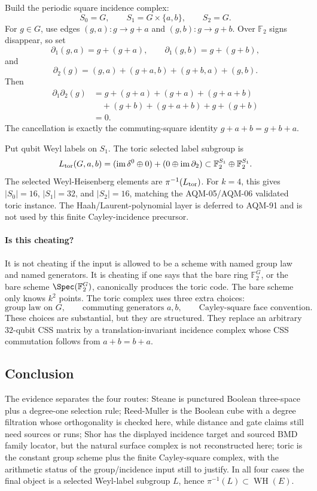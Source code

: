 Build the periodic square incidence complex:
\[
  S_0=G,\qquad S_1=G\times\{a,b\},\qquad S_2=G .
\]
For \(g\in G\), use edges \((g,a):g\to g+a\) and \((g,b):g\to g+b\).  Over
\(\mathbb F_2\) signs disappear, so set
\[
  \partial_1(g,a)=g+(g+a),\qquad
  \partial_1(g,b)=g+(g+b),
\]
and
\[
  \partial_2(g)=(g,a)+(g+a,b)+(g+b,a)+(g,b).
\]
Then
\[
\begin{aligned}
\partial_1\partial_2(g)
&=g+(g+a)+(g+a)+(g+a+b)\\
&\quad +(g+b)+(g+a+b)+g+(g+b)\\
&=0 .
\end{aligned}
\]
The cancellation is exactly the commuting-square identity \(g+a+b=g+b+a\).

Put qubit Weyl labels on \(S_1\).  The toric selected label subgroup is
\[
  L_{\rm tor}(G,a,b)
  =
  (\operatorname{im}\delta^0\oplus0)+(0\oplus\operatorname{im}\partial_2)
  \subset \mathbb F_2^{S_1}\oplus\mathbb F_2^{S_1}.
\]
The selected Weyl-Heisenberg elements are \(\pi^{-1}(L_{\rm tor})\).  For
\(k=4\), this gives \(|S_0|=16\), \(|S_1|=32\), and \(|S_2|=16\), matching the
AQM-05/AQM-06 validated toric instance.  The Haah/Laurent-polynomial layer is
deferred to AQM-91 and is not used by this finite Cayley-incidence precursor.

\paragraph{Is this cheating?}
It is not cheating if the input is allowed to be a scheme with named group law
and named generators.  It is cheating if one says that the bare ring
\(\mathbb F_2^G\), or the bare scheme \(\Spec(\mathbb F_2^G)\), canonically
produces the toric code.  The bare scheme only knows \(k^2\) points.  The toric
complex uses three extra choices:
\[
  \text{group law on }G,\qquad
  \text{commuting generators }a,b,\qquad
  \text{Cayley-square face convention}.
\]
These choices are substantial, but they are structured.  They replace an
arbitrary \(32\)-qubit CSS matrix by a translation-invariant incidence complex
whose CSS commutation follows from \(a+b=b+a\).

\subsection{Conclusion}

The evidence separates the four routes: Steane is punctured Boolean
three-space plus a degree-one selection rule; Reed-Muller is the Boolean cube
with a degree filtration whose orthogonality is checked here, while distance
and gate claims still need sources or runs; Shor has the displayed incidence
target and sourced BMD family locator, but the natural surface complex is not
reconstructed here; toric is the constant group scheme plus the finite
Cayley-square complex, with the arithmetic status of the group/incidence input
still to justify.  In all four cases the final object is a selected
Weyl-label subgroup \(L\), hence \(\pi^{-1}(L)\subset\operatorname{WH}(E)\).
